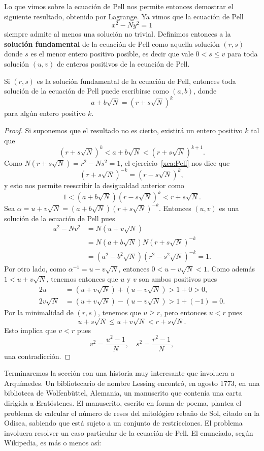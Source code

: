 Lo que vimos sobre la ecuación de Pell nos permite entonces demostrar el
siguiente resultado, obtenido por Lagrange. Ya vimos que la ecuación de Pell 
\[
	x^2-Ny^2=1
\]
siempre admite al menos una solución no trivial. Definimos
entonces a la \textbf{solución fundamental} de la ecuación de Pell como aquella
solución $(r,s)$ donde $s$ es el menor entero positivo posible, es
decir que vale $0<s\leq v$ para toda solución $(u,v)$ de enteros
positivos de la ecuación de Pell.

\begin{theorem}[Lagrange]
	Si $(r,s)$ es la solución fundamental de la ecuación de Pell, entonces toda
	solución de la ecuación de Pell
	puede escribirse como $(a,b)$, donde
	\[
		a+b\sqrt{N}=(r+s\sqrt{N})^k
	\]
	para algún entero positivo $k$. 
\end{theorem}

\begin{proof}
	Si suponemos que el resultado no es cierto, existirá un entero positivo $k$
	tal que
	\[
		(r+s\sqrt{N})^k<a+b\sqrt{N}<(r+s\sqrt{N})^{k+1}.
	\]
	Como $N(r+s\sqrt{N})=r^2-Ns^2=1$, el ejercicio~\ref{xca:Pell} nos 
	dice que 
	\[
		(r+s\sqrt{N})^{-k}=(r-s\sqrt{N})^k, 
	\]
	y esto nos permite reescribir la desigualdad anterior como
	\[
		1<(a+b\sqrt{N})(r-s\sqrt{N})^{k}<r+s\sqrt{N}.
	\]
	Sea $\alpha=u+v\sqrt{N}=(a+b\sqrt{N})(r+s\sqrt{N})^{-k}$. Entonces
	$(u,v)$ es una solución de la ecuación de Pell
	pues 
	\begin{align*}
		u^2-Nv^2&=N(u+v\sqrt{N})\\
		&=N(a+b\sqrt{N})N(r+s\sqrt{N})^{-k}\\
		&=(a^2-b^2\sqrt{N})(r^2-s^2\sqrt{N})^{-k}=1.
	\end{align*}
	Por otro lado, como $\alpha^{-1}=u-v\sqrt{N}$, entonces $0<u-v\sqrt{N}<1$.
	Como además $1<u+v\sqrt{N}$, tenemos entonces que $u$ y $v$ son ambos
	positivos pues 
	\begin{align*}
		2u&=(u+v\sqrt{N})+(u-v\sqrt{N})>1+0>0,\\
		2v\sqrt{N}&=(u+v\sqrt{N})-(u-v\sqrt{N})>1+(-1)=0.
	\end{align*}
	Por la minimalidad de $(r,s)$, tenemos que $u\geq r$, pero entonces $u<r$ pues 
	\[
		u+s\sqrt{N}\leq u+v\sqrt{N}<r+s\sqrt{N}.
	\]
	Esto implica que $v<r$ pues 
	\[
		v^2=\frac{u^2-1}{N},\quad
		s^2=\frac{r^2-1}{N},
	\]
	una contradicción.
\end{proof}


Terminaremos la sección con una historia muy interesante
que involucra a Arquímedes. 
Un bibliotecario de nombre 
Lessing encontró, en agosto 1773, en una biblioteca 
de Wolfenbüttel, Alemania, un manuscrito que contenía una carta dirigida a
Eratóstenes. El manuscrito, escrito en forma de poema, plantea el
problema de calcular el número de reses del mitológico rebaño de Sol, citado en
la Odisea, sabiendo que está sujeto a un conjunto de restricciones.  El
problema involucra resolver un caso particular de la ecuación de
Pell. El enunciado, según Wikipedia, es más o menos así:

